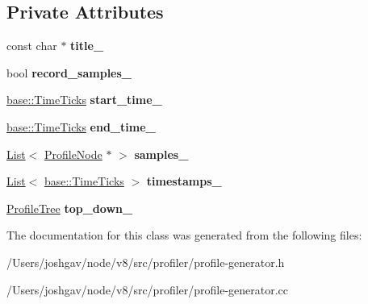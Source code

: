 \subsection*{Private Attributes}
\begin{DoxyCompactItemize}
\item 
const char $\ast$ {\bfseries title\+\_\+}\hypertarget{classv8_1_1internal_1_1_cpu_profile_a6355273dc0e79fab26bddbc9f094c321}{}\label{classv8_1_1internal_1_1_cpu_profile_a6355273dc0e79fab26bddbc9f094c321}

\item 
bool {\bfseries record\+\_\+samples\+\_\+}\hypertarget{classv8_1_1internal_1_1_cpu_profile_aecc913a1a0e05496ae293e0cf140400b}{}\label{classv8_1_1internal_1_1_cpu_profile_aecc913a1a0e05496ae293e0cf140400b}

\item 
\hyperlink{classv8_1_1base_1_1_time_ticks}{base\+::\+Time\+Ticks} {\bfseries start\+\_\+time\+\_\+}\hypertarget{classv8_1_1internal_1_1_cpu_profile_a293e74b3327d92f258e05de645c856b1}{}\label{classv8_1_1internal_1_1_cpu_profile_a293e74b3327d92f258e05de645c856b1}

\item 
\hyperlink{classv8_1_1base_1_1_time_ticks}{base\+::\+Time\+Ticks} {\bfseries end\+\_\+time\+\_\+}\hypertarget{classv8_1_1internal_1_1_cpu_profile_a0c9de2531b46b29b48d2f139bc203913}{}\label{classv8_1_1internal_1_1_cpu_profile_a0c9de2531b46b29b48d2f139bc203913}

\item 
\hyperlink{classv8_1_1internal_1_1_list}{List}$<$ \hyperlink{classv8_1_1internal_1_1_profile_node}{Profile\+Node} $\ast$ $>$ {\bfseries samples\+\_\+}\hypertarget{classv8_1_1internal_1_1_cpu_profile_aed0db76248c5a7ddde9459bd77a90b50}{}\label{classv8_1_1internal_1_1_cpu_profile_aed0db76248c5a7ddde9459bd77a90b50}

\item 
\hyperlink{classv8_1_1internal_1_1_list}{List}$<$ \hyperlink{classv8_1_1base_1_1_time_ticks}{base\+::\+Time\+Ticks} $>$ {\bfseries timestamps\+\_\+}\hypertarget{classv8_1_1internal_1_1_cpu_profile_afd972b02f55cab47114d61ff6a0fe65b}{}\label{classv8_1_1internal_1_1_cpu_profile_afd972b02f55cab47114d61ff6a0fe65b}

\item 
\hyperlink{classv8_1_1internal_1_1_profile_tree}{Profile\+Tree} {\bfseries top\+\_\+down\+\_\+}\hypertarget{classv8_1_1internal_1_1_cpu_profile_a5dc7d8b827dc5034d6dccefbcebd0aff}{}\label{classv8_1_1internal_1_1_cpu_profile_a5dc7d8b827dc5034d6dccefbcebd0aff}

\end{DoxyCompactItemize}


The documentation for this class was generated from the following files\+:\begin{DoxyCompactItemize}
\item 
/\+Users/joshgav/node/v8/src/profiler/profile-\/generator.\+h\item 
/\+Users/joshgav/node/v8/src/profiler/profile-\/generator.\+cc\end{DoxyCompactItemize}

